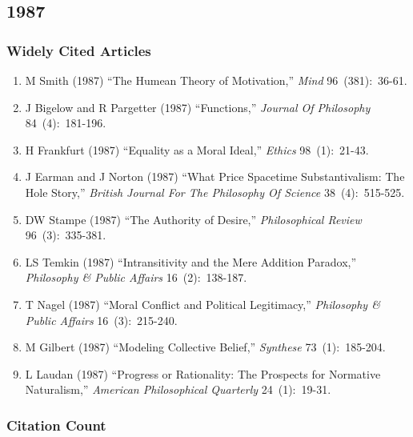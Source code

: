 \documentclass[
  10pt,
  letterpaper,
  DIV=11,
  numbers=noendperiod,
  twoside]{scrartcl}
\providecommand{\tightlist}{%
  \setlength{\itemsep}{0pt}\setlength{\parskip}{0pt}}\usepackage{longtable,booktabs,array}
\begin{document}
\newpage

\subsection{1987}\label{sec-s1987}

\subsubsection*{Widely Cited Articles}\label{widely-cited-articles-31}

\begin{enumerate}
\def\labelenumi{\arabic{enumi}.}
\tightlist
\item
  M Smith (1987) ``The Humean Theory of Motivation,'' \emph{Mind}
  96~(381):~36-61.
\item
  J Bigelow and R Pargetter (1987) ``Functions,'' \emph{Journal Of
  Philosophy} 84~(4):~181-196.
\item
  H Frankfurt (1987) ``Equality as a Moral Ideal,'' \emph{Ethics}
  98~(1):~21-43.
\item
  J Earman and J Norton (1987) ``What Price Spacetime Substantivalism:
  The Hole Story,'' \emph{British Journal For The Philosophy Of Science}
  38~(4):~515-525.
\item
  DW Stampe (1987) ``The Authority of Desire,'' \emph{Philosophical
  Review} 96~(3):~335-381.
\item
  LS Temkin (1987) ``Intransitivity and the Mere Addition Paradox,''
  \emph{Philosophy \& Public Affairs} 16~(2):~138-187.
\item
  T Nagel (1987) ``Moral Conflict and Political Legitimacy,''
  \emph{Philosophy \& Public Affairs} 16~(3):~215-240.
\item
  M Gilbert (1987) ``Modeling Collective Belief,'' \emph{Synthese}
  73~(1):~185-204.
\item
  L Laudan (1987) ``Progress or Rationality: The Prospects for Normative
  Naturalism,'' \emph{American Philosophical Quarterly} 24~(1):~19-31.
\end{enumerate}

\subsubsection*{Citation Count}\label{sec-count-1987}
\end{document}
